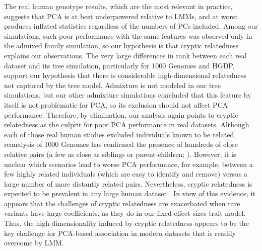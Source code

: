 \documentclass[11pt]{article}
\begin{document}
The real human genotype results, which are the most relevant in practice, suggests that PCA is at best underpowered relative to LMMs, and at worst produces inflated statistics regardless of the numbers of PCs included.
Among our simulations, such poor performance with the same features was observed only in the admixed family simulation, so our hypothesis is that cryptic relatedness explains our observations.
The very large differences in rank between each real dataset and its tree simulation, particularly for 1000 Genomes and HGDP, support our hypothesis that there is considerable high-dimensional relatedness not captured by the tree model.
Admixture is not modeled in our tree simulations, but our other admixture simulations concluded that this feature by itself is not problematic for PCA, so its exclusion should not affect PCA performance.
Therefore, by elimination, our analysis again points to cryptic relatedness as the culprit for poor PCA performance in real datasets.
Although each of those real human studies excluded individuals known to be related, reanalysis of 1000 Genomes has confirmed the presence of hundreds of close relative pairs (a few as close as siblings or parent-children; \cite{gazal_high_2015, al-khudhair_inference_2015, fedorova_atlas_2016, schlauch_identification_2017}).
However, it is unclear which scenarios lead to worse PCA performance, for example, between a few highly related individuals (which are easy to identify and remove) versus a large number of more distantly related pairs.
Nevertheless, cryptic relatedness is expected to be prevalent in any large human dataset \citep{henn_cryptic_2012, shchur_number_2018}.
In view of this evidence, it appears that the challenges of cryptic relatedness are exacerbated when rare variants have large coefficients, as they do in our fixed-effect-sizes trait model.
Thus, the high-dimensionality induced by cryptic relatedness appears to be the key challenge for PCA-based association in modern datasets that is readily overcome by LMM.
\end{document}
